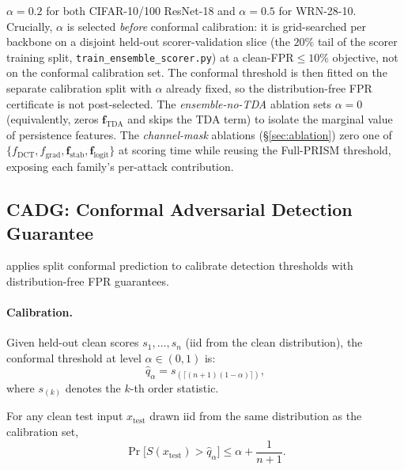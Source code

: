 $\alpha = 0.2$ for both CIFAR-10/100 ResNet-18 and $\alpha = 0.5$ for
WRN-28-10. Crucially, $\alpha$ is selected \emph{before} conformal
calibration: it is grid-searched per backbone on a disjoint held-out
scorer-validation slice (the $20\%$ tail of the scorer training split,
\texttt{train\_ensemble\_scorer.py}) at a clean-FPR${\le}10\%$ objective,
not on the conformal calibration set. The conformal threshold is then
fitted on the separate calibration split with $\alpha$ already fixed, so
the distribution-free FPR certificate is not post-selected. The
\emph{ensemble-no-TDA} ablation sets $\alpha = 0$ (equivalently, zeros
$\mathbf{f}_\mathrm{TDA}$ and skips the TDA term) to isolate the
marginal value of persistence features. The \emph{channel-mask}
ablations (\S\ref{sec:ablation}) zero one of
$\{f_\mathrm{DCT}, f_\mathrm{grad}, \mathbf{f}_\mathrm{stab},
\mathbf{f}_\mathrm{logit}\}$ at scoring time while reusing the
Full-PRISM threshold, exposing each family's per-attack contribution.

\subsection{CADG: Conformal Adversarial Detection Guarantee}
\label{sec:cadg}

\prism applies split conformal prediction \cite{vovk2005algorithmic,angelopoulos2023gentle} 
to calibrate detection thresholds with distribution-free FPR guarantees.

\paragraph{Calibration.}
Given held-out clean scores $s_1, \ldots, s_n$ (iid from the clean distribution), 
the conformal threshold at level $\alpha \in (0,1)$ is:
\begin{equation}
  \hat{q}_\alpha = s_{(\lceil (n+1)(1-\alpha) \rceil)},
  \label{eq:quantile}
\end{equation}
where $s_{(k)}$ denotes the $k$-th order statistic.

\begin{proposition}
\label{prop:coverage}
For any clean test input $x_{\text{test}}$ drawn iid from the same 
distribution as the calibration set,
\[
  \Pr\bigl[S(x_{\text{test}}) > \hat{q}_\alpha\bigr] \leq \alpha + \frac{1}{n+1}.
\]
\end{proposition}

